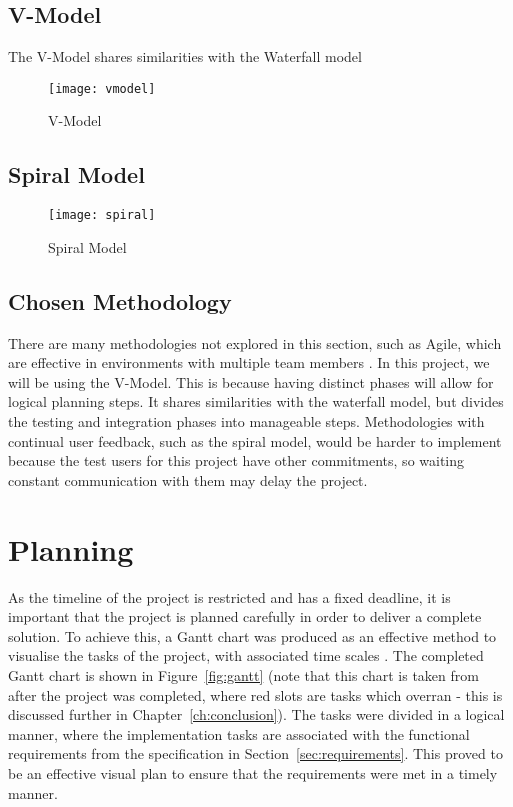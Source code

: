 \subsection{V-Model}
The V-Model shares similarities with the Waterfall model
\begin{figure}
	\centering
	\texttt{[image: vmodel]}
	\caption{V-Model}
	\label{fig:vmodel}
\end{figure}

\subsection{Spiral Model}
	\begin{figure}
	\centering
	\texttt{[image: spiral]}
	\caption{Spiral Model}
	\label{fig:spiral}
\end{figure}

\subsection{Chosen Methodology}
There are many methodologies not explored in this section, such as Agile, which are effective in environments with multiple team members \cite{agile}. In this project, we will be using the V-Model. This is because having distinct phases will allow for logical planning steps. It shares similarities with the waterfall model, but divides the testing and integration phases into manageable steps. Methodologies with continual user feedback, such as the spiral model, would be harder to implement because the test users for this project have other commitments, so waiting constant communication with them may delay the project.

\section{Planning}
As the timeline of the project is restricted and has a fixed deadline, it is important that the project is planned carefully in order to deliver a complete solution. To achieve this, a Gantt chart was produced as an effective method to visualise the tasks of the project, with associated time scales \cite{wilson2003gantt}. The completed Gantt chart is shown in Figure~\ref{fig:gantt} (note that this chart is taken from after the project was completed, where red slots are tasks which overran - this is discussed further in Chapter~\ref{ch:conclusion}). The tasks were divided in a logical manner, where the implementation tasks are associated with the functional requirements from the specification in Section~\ref{sec:requirements}. This proved to be an effective visual plan to ensure that the requirements were met in a timely manner.

